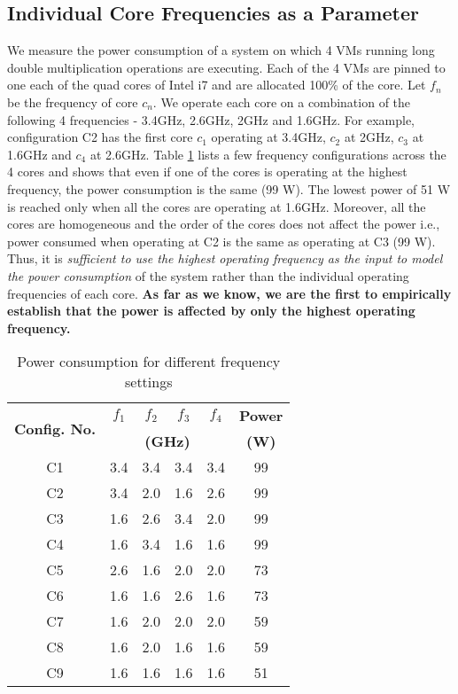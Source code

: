 \documentclass{sig-alternate}
\begin{document}
\subsection{Individual Core Frequencies as a Parameter}
We measure the power consumption of a system on which 4 VMs running long double multiplication operations are executing. Each of the 4 VMs are pinned to one each of the quad cores of Intel i7 and are allocated 100\% of the core. Let $f_n$ be the frequency of core $c_n$. We operate each core on a combination of the following 4 frequencies - 3.4GHz, 2.6GHz, 2GHz and 1.6GHz. For example, configuration C2 has the first core $c_1$ operating at 3.4GHz, $c_2$ at 2GHz, $c_3$ at 1.6GHz and $c_4$ at 2.6GHz. Table \ref{corefi7} lists a few frequency configurations across the 4 cores and shows that even if one of the cores is operating at the highest frequency, the power consumption is the same (99 W). The lowest power of 51 W is reached only when all the cores are operating at 1.6GHz. Moreover, all the cores are homogeneous and the order of the cores does not affect the power i.e., power consumed when operating at C2 is the same as operating at C3 (99 W). Thus, it is \emph{sufficient to use the highest operating frequency as the input to model the power consumption} of the system rather than the individual operating frequencies of each core. \textbf{As far as we know, we are the first to empirically establish that the power is affected by only the highest operating frequency.}
\begin{table}[!htbp]
\vspace{-0.5cm}
\caption{Power consumption for different frequency settings}
\begin{center}
\begin{tabular}{|c||c|c|c|c||c|}
\hline
\multirow{2}{*}{\textbf{Config. No.}}	&	\textbf{$f_1$}	&	\textbf{$f_2$}	&	\textbf{$f_3$}	&	\textbf{$f_4$}	&	\textbf{Power}\\ \cline{2-6}
& \multicolumn{4}{c||}{\textbf{(GHz)}} & \textbf{(W)} \\ \hline
C1	&	3.4	&	3.4	&	3.4	&	3.4	&	99	\\ \hline
C2	&	3.4	&	2.0	&	1.6	&	2.6	&	99	\\ \hline
C3	&	1.6	&	2.6	&	3.4	&	2.0	&	99	\\ \hline
C4	&	1.6	&	3.4	&	1.6	&	1.6	&	99	\\ \hline
C5	&	2.6	&	1.6	&	2.0	&	2.0	&	73	\\ \hline
C6	&	1.6	&	1.6	&	2.6	&	1.6	&	73	\\ \hline
C7	&	1.6	&	2.0	&	2.0	&	2.0	&	59	\\ \hline
C8	&	1.6	&	2.0	&	1.6	&	1.6	&	59	\\ \hline
C9	&	1.6	&	1.6	&	1.6	&	1.6	&	51	\\ \hline
\end{tabular}
\end{center}
\vspace{-0.5cm}
\label{corefi7}
\end{table}
\end{document}

